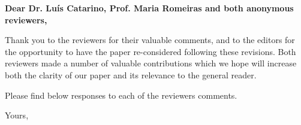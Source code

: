 \documentclass[a4paper]{letter}
\begin{document}



\begin{letter}{} %


	\opening{\textbf{Dear Dr. Lu\'{i}s Catarino, Prof. Maria Romeiras and both anonymous reviewers,}}
 
Thank you to the reviewers for their valuable comments, and to the editors for the opportunity to have the paper re-considered following these revisions. Both reviewers made a number of valuable contributions which we hope will increase both the clarity of our paper and its relevance to the general reader. 

Please find below responses to each of the reviewers comments.

\vspace{\parskip} %
\closing{Yours,}
\vspace{2\parskip} %
\end{letter}
 
\end{document}
